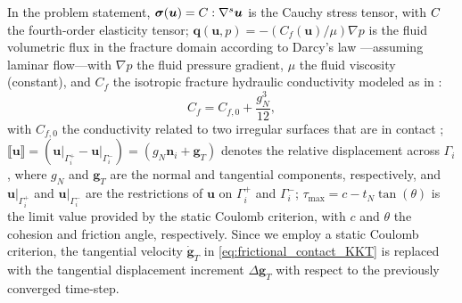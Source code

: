\documentclass[3p,times]{elsarticle}
\theoremstyle{plain}
\renewcommand{\vec}[1]{\boldsymbol{#1}}
\newcommand{\tensorOne}[1]{\boldsymbol#1}
\newcommand{\tensorTwo}[1]{\boldsymbol#1}
\newcommand{\tensorFour}[1]{\textbf{\sffamily #1}}
\begin{document}
%
In the problem statement, $\tensorTwo{\sigma}(\vec{u}) = \tensorFour{C}: \nabla^s \vec{u}$
is the Cauchy stress tensor, with $\tensorFour{C}$ the fourth-order elasticity tensor;
$\vec{q} (\vec{u},p) = -(C_f(\vec{u})/\mu) \nabla p$ is
the fluid volumetric flux in the fracture domain according to Darcy's law \cite{witherspoon1980validity}---assuming laminar flow---with $\nabla p$ the fluid pressure gradient,
$\mu$ the fluid viscosity (constant), and $C_f$ the isotropic fracture hydraulic
conductivity modeled as in \cite{GarKarTch16}:
\begin{equation}
  C_f = C_{f,0} + \frac{g_N^3}{12},
  \label{eq:cond_def}
\end{equation}
with $C_{f,0}$ the conductivity related to two irregular surfaces that are in contact
\cite{kamenov2013laboratory}; %
$\llbracket \vec{u} \rrbracket = ( \left.\vec{u}\right|_{ \Gamma_i^+ } - \left.\vec{u}
\right|_{ \Gamma_i^- } ) = (g_N \vec{n}_i + \vec{g}_T)$ denotes the relative displacement
across $\Gamma_i$, where $g_N$ and $\vec{g}_T$ are the normal and tangential components,
respectively, and $\left.\vec{u}\right|_{ \Gamma_i^+ }$ and $\left.\vec{u}\right|_{
\Gamma_i^- }$ are the restrictions of $\vec{u}$ on $\Gamma_i^+$ and $\Gamma_i^-$;
$\tau_{\text{max}} = c - t_N \tan(\theta)$ is the limit value provided by the static
Coulomb criterion, with $c$ and $\theta$ the cohesion and friction angle, respectively.
Since we employ a static Coulomb criterion, the tangential velocity
$\dot{\tensorOne{g}}_T$ in \eqref{eq:frictional_contact_KKT} is replaced with the tangential
displacement increment $\Delta{\tensorOne{g}}_T$ \cite{wohlmuth2011variationally} with
respect to the previously converged time-step. %
\end{document}
